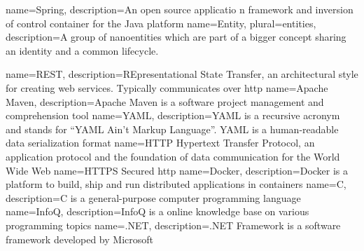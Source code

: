 {
  name={Spring},
  description={An open source applicatio	n framework and inversion of control container for the Java platform}
}
{
	name={Entity},
	plural={entities},
	description={A group of nanoentities which are part of a bigger concept sharing an identity and a common lifecycle.\cite{evans2003domain}}
}

{
  name={REST},
  description={REpresentational State Transfer, an architectural style for creating web services. Typically communicates over \gls{http}}
}
{
  name={Apache Maven},
  description={Apache Maven is a software project management and comprehension tool}
}
{
  name={YAML},
  description={YAML is a recursive acronym and stands for \enquote{YAML Ain't Markup Language}. YAML is a human-readable data serialization format}
}
{
  name={HTTP}
}
{
	Hypertext Transfer Protocol, an application protocol and the foundation of data communication for the World Wide Web \cite{http_wikipedia}
}
{
  name={HTTPS}
}
{
	Secured \gls{http}
}
{
  name={Docker},
  description={Docker is a platform to build, ship and run distributed applications in containers}
}
{
  name={C},
  description={C is a general-purpose computer programming language}
}
{
  name={InfoQ},
  description={InfoQ is a online knowledge base on various programming topics}
}
{
  name={.NET},
  description={.NET Framework is a software framework developed by Microsoft}
}

